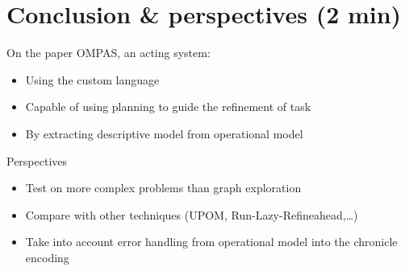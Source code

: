 \section{Conclusion \& perspectives (2 min)}
\begin{frame}[c]{On the paper}
    OMPAS, an acting system:
        \begin{itemize}
            \item Using the custom language
            \item Capable of using planning to guide the refinement of task
            \item By extracting descriptive model from operational model
        \end{itemize}

\end{frame}
\begin{frame}[c]{Perspectives}
    \begin{itemize}
        \item Test on more complex problems than graph exploration
        \pause
        \item Compare with other techniques (UPOM, Run-Lazy-Refineahead,\dots)
        \pause
        \item Take into account error handling from operational model into the chronicle encoding
    \end{itemize}
\end{frame}